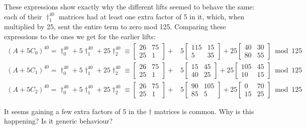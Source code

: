 \documentclass[a4paper, 12pt, reqno]{amsart}
\begin{document}
		These expressions show exactly why the different lifts seemed to behave the same: each of their $\dag_1^{40}$ matrices had at least one extra factor of 5 in it, 
		which, when multiplied by 25, sent the entire term to zero mod 125. Comparing these expressions to the ones we get for the earlier lifts:
		\begin{align*}
			(A + 5C_0)^{40} = \dag_0^{40} + 5\dag_1^{40} + 25\dag_2^{40} \equiv \begin{bmatrix}
				26 & 75 \\
				25 &  1
			\end{bmatrix} +& 5\begin{bmatrix}
				115 & 15 \\
				  5 & 35
			\end{bmatrix} + 25\begin{bmatrix}
				40 & 30 \\
				80 & 55
			\end{bmatrix} \bmod{125} \\
			(A + 5C_1)^{40} = \dag_0^{40} + 5\dag_1^{40} + 25\dag_2^{40} \equiv \begin{bmatrix}
				26 & 75 \\
				25 &  1
			\end{bmatrix} +& 5\begin{bmatrix}
				15 & 45 \\
				40 & 25
			\end{bmatrix} + 25\begin{bmatrix}
				105 & 45 \\
				 10 & 15
			\end{bmatrix} \bmod{125} \\
			(A + 5C_2)^{40} = \dag_0^{40} + 5\dag_1^{40} + 25\dag_2^{40} \equiv \begin{bmatrix}
				26 & 75 \\
				25 &  1
			\end{bmatrix} +& 5\begin{bmatrix}
				90 & 105 \\
				85 &   5
			\end{bmatrix} + 25\begin{bmatrix}
				 0 & 70 \\
				15 & 25
			\end{bmatrix} \bmod{125}
		\end{align*}
		
		It seems gaining a few extra factors of 5 in the $\dag$ matrices is common. Why is this happening? Is it generic behaviour?
		
\end{document}
